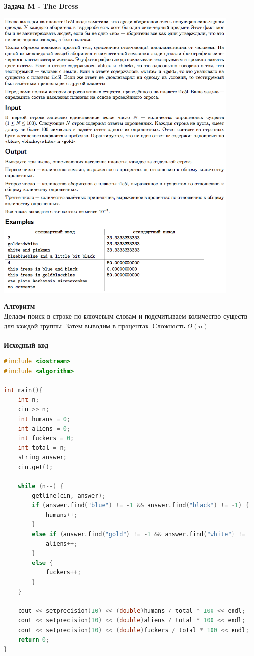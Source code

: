 \documentclass[a4paper,12pt]{article}
\begin{document}
\textbf{{\large Задача M - The Dress}} \\
\begin{center}
\includegraphics[width=0.9\textwidth]{OC_Tatarstan/OC_Tatarstan_M.png}\\ [1cm]
\end{center}
\newpage

\textbf{{\large Алгоритм}} \\
Делаем поиск в строке по ключевым словам и подсчитываем количество существ для  каждой группы. Затем выводим в процентах. Сложность $O(n)$. \\ 
\\
\textbf{{\large Исходный код}}
\begin{lstlisting}[language=C++]
#include <iostream>
#include <algorithm>

int main(){
    int n;
    cin >> n;
    int humans = 0;
    int aliens = 0;
    int fuckers = 0;
    int total = n;
    string answer;
    cin.get();

    while (n--) {
        getline(cin, answer);
        if (answer.find("blue") != -1 && answer.find("black") != -1) {
            humans++;
        }
        else if (answer.find("gold") != -1 && answer.find("white") != -1) {
            aliens++;
        }
        else {
            fuckers++;
        }
    }

    cout << setprecision(10) << (double)humans / total * 100 << endl;
    cout << setprecision(10) << (double)aliens / total * 100 << endl;
    cout << setprecision(10) << (double)fuckers / total * 100 << endl;
    return 0;
}
\end{lstlisting}
\end{document}
